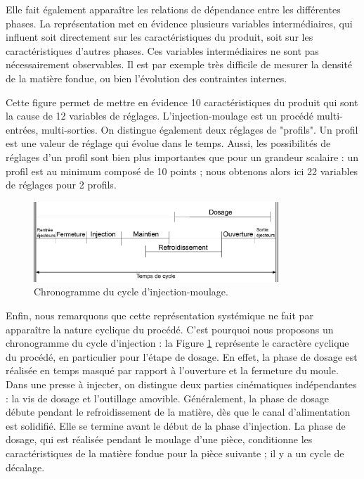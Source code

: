 Elle fait également apparaître les relations de dépendance entre les différentes phases.
La représentation met en évidence plusieurs variables intermédiaires, qui influent soit directement sur les caractéristiques du produit, soit sur les caractéristiques d'autres phases.
Ces variables intermédiaires ne sont pas nécessairement observables.
Il est par exemple très difficile de mesurer la densité de la matière fondue, ou bien l'évolution des contraintes internes.

Cette figure permet de mettre en évidence 10 caractéristiques du produit qui sont la cause de 12 variables de réglages.
L'injection-moulage est un procédé multi-entrées, multi-sorties.
On distingue également deux réglages de "profils".
Un profil est une valeur de réglage qui évolue dans le temps.
Aussi, les possibilités de réglages d'un profil sont bien plus importantes que pour un grandeur scalaire : un profil est au minimum composé de 10 points ; nous obtenons alors ici 22 variables de réglages pour 2 profils.

\begin{figure}[bthp]
	\centering
	\includegraphics[width=0.82\textwidth,height=\textheight,keepaspectratio]{../Chap1/Figures/SAPRISTI_Chronogramme-Simple.png}
	\caption{Chronogramme du cycle d'injection-moulage.}
	\label{fig:chronogramme}
\end{figure}

Enfin, nous remarquons que cette représentation systémique ne fait par apparaître la nature cyclique du procédé.
C'est pourquoi nous proposons un chronogramme du cycle d’injection : la Figure \ref{fig:chronogramme} représente le caractère cyclique du procédé, en particulier pour l'étape de dosage.
En effet, la phase de dosage est réalisée en temps masqué par rapport à l'ouverture et la fermeture du moule.
Dans une presse à injecter, on distingue deux parties cinématiques indépendantes : la vis de dosage et l'outillage amovible.
Généralement, la phase de dosage débute pendant le refroidissement de la matière, dès que le canal d’alimentation est solidifié.
Elle se termine avant le début de la phase d'injection.
La phase de dosage, qui est réalisée pendant le moulage d'une pièce, conditionne les caractéristiques de la matière fondue pour la pièce suivante ; il y a un cycle de décalage.

